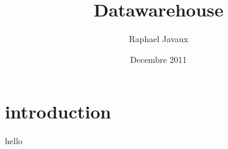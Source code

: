 \documentclass[a4paper,11pt]{report}
\title{Datawarehouse}
\author{Raphael Javaux}
\date{Decembre 2011}
\begin{document}
\maketitle
\newpage

\tableofcontents
\newpage

\chapter{introduction}

hello
\end{document}
